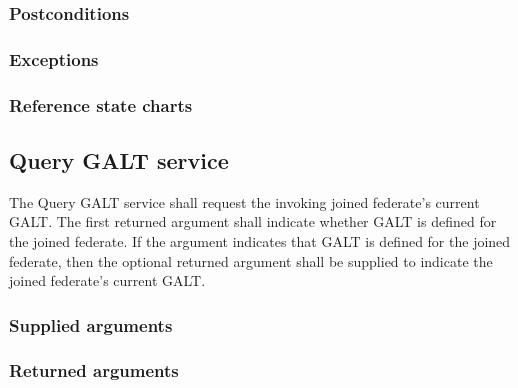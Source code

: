 \begin{compactstdpage}

    \subsubsection{Postconditions}


    \subsubsection{Exceptions}


    \subsubsection{Reference state charts}


    \subsection{Query GALT service}

    The Query GALT service shall request the invoking joined federate's current GALT. The first returned argument shall indicate whether GALT is defined for the joined federate. If the argument indicates that GALT is defined for the joined federate, then the optional returned argument shall be supplied to indicate the joined federate's current GALT.

    \subsubsection{Supplied arguments}


    \subsubsection{Returned arguments}


\end{compactstdpage}
